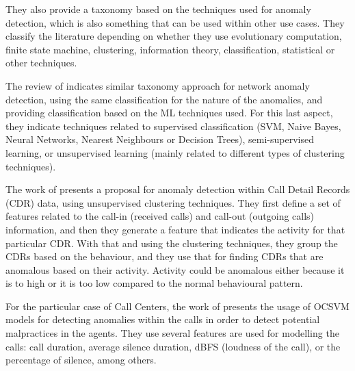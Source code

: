 They also provide a taxonomy based on the techniques used for anomaly detection, which is also something that can be used within other use cases. They classify the literature depending on whether they use evolutionary computation, finite state machine, clustering, information theory, classification, statistical or other techniques.

The review of \parencite{ali2020review} indicates similar taxonomy approach for network anomaly detection, using the same classification for the nature of the anomalies, and providing classification based on the ML techniques used. For this last aspect, they indicate techniques related to supervised classification (SVM, Naive Bayes, Neural Networks, Nearest Neighbours or Decision Trees), semi-supervised learning, or unsupervised learning (mainly related to different types of clustering techniques).

The work of \parencite{gunavathi2019big} presents a proposal for anomaly detection within Call Detail Records (CDR) data, using unsupervised clustering techniques. They first define a set of features related to the call-in (received calls) and call-out (outgoing calls) information, and then they generate a feature that indicates the activity for that particular CDR. With that and using the clustering techniques, they group the CDRs based on the behaviour, and they use that for finding CDRs that are anomalous based on their activity. Activity could be anomalous either because it is to high or it is too low compared to the normal behavioural pattern.

For the particular case of Call Centers, the work of \parencite{iheme2019feature} presents the usage of OCSVM models for detecting anomalies within the calls in order to detect potential malpractices in the agents. They use several features are used for modelling the calls: call duration, average silence duration, dBFS (loudness of the call), or the percentage of silence, among others.

